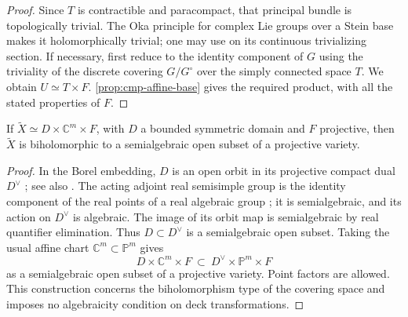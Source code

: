 \begin{proof}
Since $T$ is contractible and paracompact, that principal bundle is topologically trivial.  The Oka principle for complex Lie groups over a Stein base makes it holomorphically trivial; one may use \cite[Theorem~1.3 and Example~(A)]{ForstnericPrezelj2000} on its continuous trivializing section.  If necessary, first reduce to the identity component of $G$ using the triviality of the discrete covering $G/G^\circ$ over the simply connected space $T$. We obtain $U\simeq T\times F$.  \cref{prop:cmp-affine-base} gives the required product, with all the stated properties of $F$.
\end{proof}

\begin{proposition}
\label{prop:cmp-converse}
If $\widetilde X\simeq D\times\mathbb{C}^m\times F$, with $D$ a bounded symmetric domain and $F$ projective, then $\widetilde X$ is biholomorphic to a semialgebraic open subset of a projective variety.
\end{proposition}

\begin{proof}
In the Borel embedding, $D$ is an open orbit in its projective compact dual $D^\vee$ \cite[\S4, Theorem~2 and \S6, Proposition~2]{Borel1954}; see also \cite[\S2.1.1, Borel embedding theorem]{FalbelGuillouxWill2024}. The acting adjoint real semisimple group is the identity component of the real points of a real algebraic group \cite[Proposition~1.7]{Milne2005}; it is semialgebraic, and its action on $D^\vee$ is algebraic. The image of its orbit map is semialgebraic by real quantifier elimination.  Thus $D\subset D^\vee$ is a semialgebraic open subset. Taking the usual affine chart $\mathbb{C}^m\subset\mathbb{P}^m$ gives
\[
 D\times\mathbb{C}^m\times F
        \ \subset\ D^\vee\times\mathbb{P}^m\times F
\]
as a semialgebraic open subset of a projective variety.  Point factors are allowed.  This construction concerns the biholomorphism type of the covering space and imposes no algebraicity condition on deck transformations.
\end{proof}

